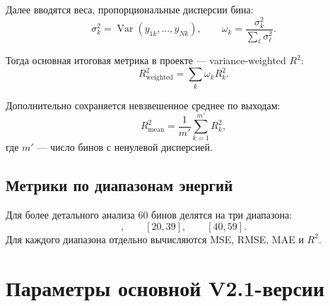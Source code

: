 \documentclass[11pt]{article}
\begin{document}
Далее вводятся веса, пропорциональные дисперсии бина:
\begin{equation}
\sigma_k^2 = \operatorname{Var}(y_{1k},\dots,y_{Nk}),
\qquad
\omega_k = \frac{\sigma_k^2}{\sum_{\ell} \sigma_{\ell}^2}.
\end{equation}

Тогда основная итоговая метрика в проекте --- variance-weighted $R^2$:
\begin{equation}
R^2_{\mathrm{weighted}} = \sum_{k} \omega_k R_k^2.
\end{equation}

Дополнительно сохраняется невзвешенное среднее по выходам:
\begin{equation}
R^2_{\mathrm{mean}} = \frac{1}{m'} \sum_{k=1}^{m'} R_k^2,
\end{equation}
где $m'$ --- число бинов с ненулевой дисперсией.

\subsection{Метрики по диапазонам энергий}

Для более детального анализа 60 бинов делятся на три диапазона:
\begin{equation}
[0,19], \qquad [20,39], \qquad [40,59].
\end{equation}
Для каждого диапазона отдельно вычисляются MSE, RMSE, MAE и $R^2$.

\section{Параметры основной V2.1-версии}
\end{document}
